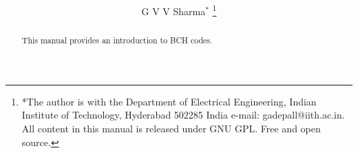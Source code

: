 \documentclass[journal,12pt,twocolumn]{IEEEtran}
\renewcommand\thesection{\arabic{section}}
\begin{document}
\let\StandardTheFigure\thefigure
\renewcommand{\thefigure}{\thesection}



\makeatletter
{}
\makeatother

\let\StandardTheFigure\thefigure
\let\StandardTheTable\thetable
\let\vec\mathbf





\def\putbox#1#2#3{\makebox[0in][l]{\makebox[#1][l]{}\raisebox{\baselineskip}[0in][0in]{\raisebox{#2}[0in][0in]{#3}}}}
     \def\rightbox#1{\makebox[0in][r]{#1}}
     \def\centbox#1{\makebox[0in]{#1}}
     \def\topbox#1{\raisebox{-\baselineskip}[0in][0in]{#1}}
     \def\midbox#1{\raisebox{-0.5\baselineskip}[0in][0in]{#1}}

\vspace{3cm}

\title{ 
}

\author{ G V V Sharma$^{*}$%
	\thanks{*The author is with the Department
		of Electrical Engineering, Indian Institute of Technology, Hyderabad
		502285 India e-mail:  gadepall@iith.ac.in. All content in this manual is released under GNU GPL.  Free and open source.}
	
}	

\maketitle

\tableofcontents

\bigskip

\renewcommand{\thefigure}{\theenumi}
\renewcommand{\thetable}{\theenumi}


\begin{abstract}
	
This manual provides an introduction to BCH codes.
\end{abstract}
%
\end{document}
